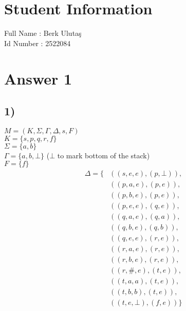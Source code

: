 \documentclass[12pt]{article}
\begin{document}
\section*{Student Information }
Full Name : Berk Ulutaş \\
Id Number :  2522084 \\

\section*{Answer 1}
\subsection*{1)} 
$M = (K,\Sigma, \Gamma, \Delta,s, F)$ \\
$K = \{s,p,q,r,f\}$ \\ 
$\Sigma = \{a,b\}$ \\ 
$\Gamma = \{a,b, \bot \}$ ($\bot$ to mark bottom of the stack)\\ 
$F = \{f\}$
\begin{equation*}
    \begin{split}
        \Delta = \{&((s,e,e),(p,\bot)),\\
                   &((p,a,e),(p,e)),\\
                   &((p,b,e),(p,e)),\\
                   &((p,e,e),(q,e)),\\
                   &((q,a,e),(q,a)),\\
                   &((q,b,e),(q,b)),\\
                   &((q,e,e),(r,e)),\\
                   &((r,a,e),(r,e)),\\
                   &((r,b,e),(r,e)),\\
                   &((r,\#,e),(t,e)),\\
                   &((t,a,a),(t,e)),\\
                   &((t,b,b),(t,e)),\\
                   &((t,e,\bot),(f,e)) \}
    \end{split}
\end{equation*}
\end{document}
